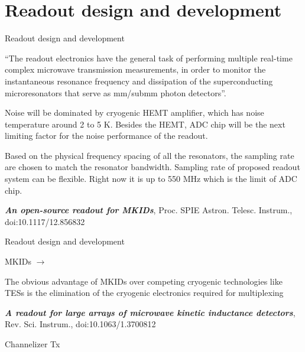 \documentclass[ignorenonframetext,12pt]{beamer}
\begin{document}
\section{Readout design and development}
\begin{frame}{Readout design and development}

				{\color[rgb]{0.8,.4,.5} ``The readout electronics have the general task of performing multiple
				real-time complex microwave transmission measurements, in order to
				monitor the instantaneous resonance frequency and dissipation of the
				superconducting microresonators that serve as mm/submm photon
				detectors''.}

				Noise will be dominated by cryogenic HEMT amplifier, which has noise
				temperature around 2 to 5 K. Besides the HEMT, ADC chip will be the next
				limiting factor for the noise performance of the readout. 

				Based on the physical frequency spacing of all the resonators, the
				sampling rate are chosen to match the resonator bandwidth. Sampling rate
				of proposed readout system can be flexible.
				Right now it is up to 550 MHz which is the limit of ADC chip.

				\emph{\textbf{An open-source readout for MKIDs}}, Proc. SPIE Astron. Telesc.
				Instrum., doi:10.1117/12.856832
\end{frame}
\begin{frame}{Readout design and development}

				MKIDs $\to$ 

				The obvious advantage of MKIDs over competing cryogenic technologies
				like TESs is the elimination of the cryogenic electronics required for multiplexing

				\emph{\textbf{A readout for large arrays of microwave kinetic inductance
				detectors}}, Rev. Sci. Instrum., doi:10.1063/1.3700812
\end{frame}
\begin{frame}{Channelizer Tx}
				\begin{center}
				\end{center}
				\begin{center}
				\end{center}
\end{frame}
\end{document}
